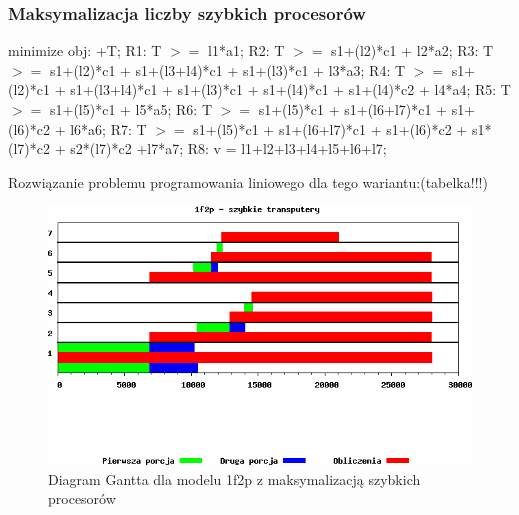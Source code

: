 \documentclass[a4paper,11pt, titlepage]{article}
\begin{document}
\subsubsection{Maksymalizacja liczby szybkich procesorów}
\begin{flushleft}

minimize obj: +T;\linebreak
\linebreak
R1: T $>=$ l1*a1;\linebreak
R2: T $>=$ s1+(l2)*c1 + l2*a2;\linebreak
R3: T $>=$ s1+(l2)*c1 + s1+(l3+l4)*c1 + s1+(l3)*c1 + l3*a3;\linebreak
R4: T $>=$ s1+(l2)*c1 + s1+(l3+l4)*c1 + s1+(l3)*c1 + s1+(l4)*c1 + s1+(l4)*c2 + l4*a4;\linebreak
R5: T $>=$ s1+(l5)*c1 + l5*a5;\linebreak
R6: T $>=$ s1+(l5)*c1 + s1+(l6+l7)*c1 + s1+(l6)*c2 + l6*a6;\linebreak
R7: T $>=$ s1+(l5)*c1 + s1+(l6+l7)*c1 + s1+(l6)*c2 + s1*(l7)*c2 + s2*(l7)*c2 +l7*a7;\linebreak
R8: v = l1+l2+l3+l4+l5+l6+l7;\linebreak
\end{flushleft}

Rozwiązanie problemu programowania liniowego dla tego wariantu:(tabelka!!!)
\begin{figure}[htp!]
\includegraphics[width=1.0\textwidth]{wykresy/2p1f_proc}
\caption{Diagram Gantta dla modelu 1f2p z maksymalizacją szybkich procesorów \label{2p1f_p}}
\end{figure}
\end{document}
